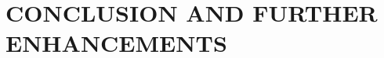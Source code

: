 \chapter{\MakeUppercase{Conclusion and Further enhancements}}
\label{chap:conclusion-further-work}
\paragraph{}
